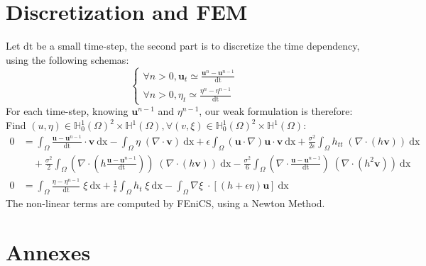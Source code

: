 \documentclass[11pt,a4paper]{article}
\begin{document}
	\section{Discretization and FEM}	
		Let $\mathrm{dt}$ be a small time-step, the second part is to discretize the time 
		dependency, using the following schemas:	
		\begin{equation}
			\left\lbrace
				\begin{array}{l}
					\displaystyle \forall n > 0, \mathbf{u}_t \simeq
					\frac{\mathbf{u}^n-\mathbf{u}^{n-1}}{\mathrm{dt}}  \\
					\displaystyle \forall n > 0, \eta_t \simeq \frac{\eta^n - \eta^{n-1}}
					{\mathrm{dt}}  
				\end{array}
			\right.
		\end{equation}
		For each time-step, knowing $\mathbf{u}^{n-1}$ and $\eta^{n-1}$, our weak 
		formulation is therefore: Find $(u,\eta) \in \mathbb{H}^1_0(\Omega)^2 \times 
		\mathbb{H}^1(\Omega), \forall (v,\xi) \in \mathbb{H}^1_0(\Omega)^2 \times 
		\mathbb{H}^1(\Omega)$: 
		\begin{equation}
			\begin{split}
				0 &= \int_{\Omega} \! \frac{\mathbf{u} 
					- \mathbf{u}^{n-1}}{\mathrm{dt}} \cdot
					\mathbf{v} \: \mathrm{dx} 
					- \int_{\Omega} \! \eta \; (\nabla \cdot \mathbf{v}) \: \mathrm{dx} +
					\epsilon \! \int_{\Omega} \! (\mathbf{u} \cdot \nabla ) \mathbf{u} \cdot 
					\mathbf{v} \: \mathrm{dx} + \frac{\sigma^2}{2 \epsilon} \! \int_{\Omega} \!  
					h_{tt}  \; (\nabla \cdot( h \mathbf{v})) \: \mathrm{dx} \\ 
					&\quad + \frac{\sigma^2}{2} \! \int_{\Omega} \!  (\nabla \cdot (h 
					\frac{\mathbf{u} - \mathbf{u}^{n-1}}{\mathrm{dt}})) \; (\nabla \cdot (h 
					\mathbf{v}) )\: \mathrm{dx} - \frac{\sigma^2}{6} \! \int_{\Omega} \! (\nabla 
					\cdot \frac{\mathbf{u} - \mathbf{u}^{n-1}}{\mathrm{dt}}) \; (\nabla  \cdot 
					(h^2  \mathbf{v})) \: \mathrm{dx} \\
					\displaystyle 0 &= \int_{\Omega}\! \frac{\eta - \eta^{n-1}}{\mathrm{dt}} \; 
					\xi \: \mathrm{dx} +\frac{1}{\epsilon}\int_{\Omega}\! h_t \; \xi \: 
					\mathrm{dx}
					-\int_{\Omega}\! \nabla \xi \; \cdot [(h+\epsilon\eta) \mathbf{u}]  \: 
					\mathrm{dx}
				\end{split}
			\end{equation}
			The non-linear terms are computed by FEniCS, using a Newton Method.
			
			\pagebreak
			
	\section*{Annexes}
		
		\pagebreak
		
		 
		
		
		\appendix
\end{document}
